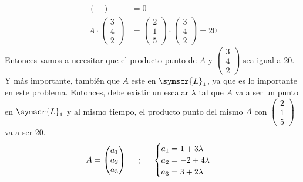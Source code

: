 \documentclass{article}
\def\fancyL{\symscr{L}}
\begin{document}
\begin{enumerate}
\[\begin{aligned}
\begin{pmatrix}
                \end{pmatrix}
                &= 0 \\
                A 
                \cdot 
                \begin{pmatrix}
                    3 \\ 4 \\ 2
                \end{pmatrix}
                &=
                \begin{pmatrix}
                    2 \\ 1 \\ 5 
                \end{pmatrix}
                \cdot 
                \begin{pmatrix}
                    3 \\ 4 \\ 2
                \end{pmatrix}
                = 20
            \end{aligned}
        \]
        Entonces vamos a necesitar que el producto punto de \(A\) y \(\left(\begin{smallmatrix}3 \\ 4 \\ 2\end{smallmatrix}\right)\) sea igual a 20. 
        Y más importante, también que \(A\) este en \(\fancyL_1\), ya que es lo importante en este problema. 
        Entonces, debe existir un escalar \(\lambda\) tal que \(A\) va a ser un punto en \(\fancyL_1\) y al mismo tiempo, 
        el producto punto del mismo \(A\) con \(\left(\begin{smallmatrix}2 \\ 1 \\ 5\end{smallmatrix}\right)\) va a ser 20.
        \[
            A = 
            \begin{pmatrix}
                a_1 \\ a_2 \\ a_3
            \end{pmatrix}
            \hspace{0.5cm}
            \text{;}
            \hspace{0.5cm}
            \begin{cases}
                a_1 = 1 + 3\lambda \\ 
                a_2 = -2 + 4\lambda \\ 
                a_3 = 3 + 2\lambda
            \end{cases}
\]
\end{enumerate}
\end{document}
